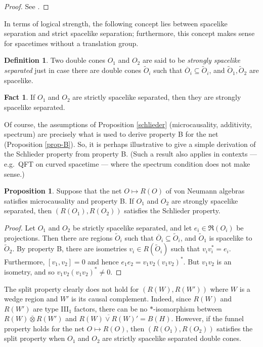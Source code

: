\documentclass[12pt]{article}
\theoremstyle{definition}
\newtheorem{fact}[thm]{Fact}
\newtheorem{prop}[thm]{Proposition}
\theoremstyle{definition}
\newtheorem{defn}[thm]{Definition}
\theoremstyle{remark}
\def\wt#1{{\tilde #1}}
\def\ol#1{{\overline #1}}
\def\al#1{{\mathfrak #1}}
\begin{document}
\begin{proof} See \cite{schlied}. \end{proof}

In terms of logical strength, the following concept lies between
spacelike separation and strict spacelike separation; furthermore,
this concept makes sense for spacetimes without a translation group.

\begin{defn} Two double cones $O_1$ and $O_2$ are said to be
  \emph{strongly spacelike separated} just in case there are double
  cones $\wt O_i$ such that $\ol O_i\subseteq \wt O_i$, and $\wt
  O_1,\wt O_2$ are spacelike.  \end{defn}

\begin{fact} If $O_1$ and $O_2$ are strictly spacelike separated, then
  they are strongly spacelike separated.  \end{fact}

Of course, the assumptions of Proposition \ref{schlieder}
(microcausality, additivity, spectrum) are precisely what is used to
derive property B for the net (Proposition \ref{prop-B}).  So, it is
perhaps illustrative to give a simple derivation of the Schlieder
property from property B.  (Such a result also applies in contexts ---
e.g.\ QFT on curved spacetime --- where the spectrum condition does
not make sense.)

\begin{prop} Suppose that the net $O\mapsto R(O)$ of von Neumann
  algebras satisfies microcausality and property B.  If $O_1$ and
  $O_2$ are strongly spacelike separated, then $(R(O_1),R(O_2))$
  satisfies the Schlieder property.
  \label{frees}
\end{prop}

\begin{proof} Let $O_1$ and $O_2$ be strictly spacelike separated, and
  let $e_i\in \al R (O_i)$ be projections.  Then there are regions
  $\wt O_i$ such that $\ol O_i\subseteq \wt O_i$, and $\wt O_1$ is
  spacelike to $\wt O_2$.  By property B, there are isometries $v_i\in
  R(\wt O_i)$ such that $v_iv_i^*=e_i$.  Furthermore, $[v_1,v_2]=0$
  and hence $e_1e_2=v_1v_2(v_1v_2)^*$.  But $v_1v_2$ is an isometry,
  and so $v_1v_2(v_1v_2)^*\neq 0$.
\end{proof}

The split property clearly does not hold for
$(R(W),R(W'))$ where $W$ is a wedge region and $W'$ is
its causal complement.  Indeed, since $R(W)$ and
$R(W')$ are type III$_1$ factors, there can be no
$*$-isomorphism between $R(W)\overline{\otimes}R(W')$
and $\overline{R(W)\vee R(W)'}=B(H)$.  However, if the
funnel property holds for the net $O\mapsto R(O)$, then
$(R(O_1),R(O_2))$ satisfies the split property when
$O_1$ and $O_2$ are strictly spacelike separated double
cones.
\end{document}
